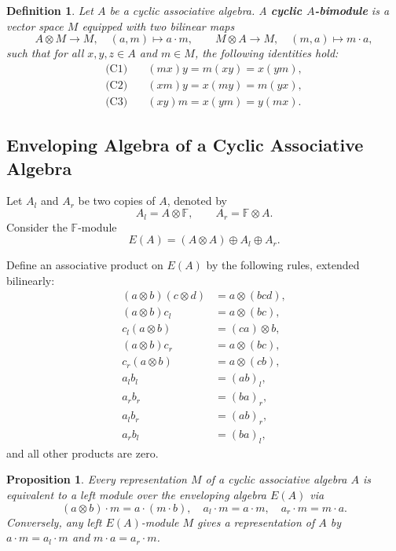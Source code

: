 \documentclass[pdflatex,sn-mathphys-num]{sn-jnl}%
\theoremstyle{thmstyleone}%
\newtheorem{proposition}[theorem]{Proposition}%
\newtheorem{definition}{Definition}[section]
\theoremstyle{thmstyletwo}%
\theoremstyle{thmstylethree}%
\begin{document}
\begin{definition}\label{def:cyclic_bimodule}
Let $A$ be a cyclic associative algebra. A \textbf{cyclic $A$-bimodule} is a vector space $M$ equipped with two bilinear maps
\[
A \otimes M \to M,\quad (a,m) \mapsto a \cdot m,
\qquad
M \otimes A \to M,\quad (m,a) \mapsto m \cdot a,
\]
such that for all $x, y, z \in A$ and $m \in M$, the following identities hold:
\begin{align}
\text{(C1)}&\quad (m x) y = m (x y) = x (y m), \label{eq:cyc1}\\
\text{(C2)}&\quad (x m) y = x (m y) = m (y x), \label{eq:cyc2}\\
\text{(C3)}&\quad (x y) m = x (y m) = y (m x). \label{eq:cyc3}
\end{align}
\end{definition}
\subsection{Enveloping Algebra of a Cyclic Associative Algebra}

Let $A_l$ and $A_r$ be two copies of $A$, denoted by
\[
A_l = A\otimes \mathbb{F}, \qquad A_r = \mathbb{F}\otimes A.
\]
Consider the $\mathbb{F}$-module
\[
E(A) = (A \otimes A) \oplus A_l \oplus A_r.
\]

Define an associative product on $E(A)$ by the following rules, extended bilinearly:
\[
\begin{aligned}
(a \otimes b)(c \otimes d) &= a \otimes (b c d), \\
(a \otimes b) c_l &= a \otimes (b c), \\
c_l (a \otimes b) &= (c a) \otimes b, \\
(a \otimes b) c_r &= a \otimes (b c), \\
c_r (a \otimes b) &= a \otimes (c b), \\
a_l b_l &= (ab)_l, \\
a_r b_r &= (ba)_r, \\
a_l b_r &= (ab)_r, \\
a_r b_l &= (ba)_l,
\end{aligned}
\]
and all other products are zero.

\begin{proposition}\label{prop:representation_module}
Every representation $M$ of a cyclic associative algebra $A$ is equivalent to a left module over the enveloping algebra $E(A)$ via
\[
(a \otimes b) \cdot m = a \cdot (m \cdot b), \quad a_l \cdot m = a \cdot m, \quad a_r \cdot m = m \cdot a.
\]
Conversely, any left $E(A)$-module $M$ gives a representation of $A$ by $a \cdot m = a_l \cdot m$ and $m \cdot a = a_r \cdot m$.
\end{proposition}
\end{document}
